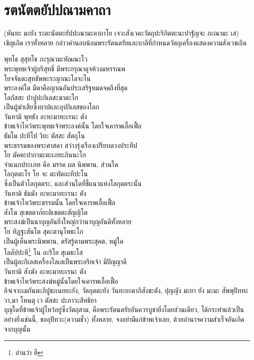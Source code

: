 \documentclass{article}
\begin{document}
\section{รตนัตตยัปปณามคาถา}
\begin{center}
(หันทะ มะยัง ระตะนัตตะยัปปะณามะคาถาโย เจวะสังเวคะวัตถุปะริกิตตะนะปาฐัญจะ ภะณามะ เส)\\เชิญเถิด เราทั้งหลาย กล่าวคำนอบน้อมพระรัตนตรัยและบาลีที่กำหนดวัตถุเครื่องแสดงความสังเวชเถิด
\end{center}
พุทโธ สุสุทโธ กะรุณามะหัณณะโว\\
\indent พระพุทธเจ้าผู้บริสุทธิ์ มีพระกรุณาดุจห้วงมหรรณพ\\
โยจจันตะสุทธัพพะระญาณะโลจะโน\\
\indent พระองค์ใด มีตาคือญาณอันประเสริฐหมดจดถึงที่สุด\\
โลกัสสะ ปาปูปะกิเลสะฆาตะโก\\
\indent เป็นผู้ฆ่าเสียซึ่งบาปและอุปกิเลสของโลก\\
วันทามิ พุทธัง อะหะมาทะเรนะ ตัง\\
\indent ข้าพเจ้าไหว้พระพุทธเจ้าพระองค์นั้น โดยใจเคารพเอื้อเฟื้อ\\
ธัมโม ปะทีโป วิยะ ตัสสะ สัตถุโน\\
\indent พระธรรมของพระศาสดา สว่างรุ่งเรืองเปรียบดวงประทีป\\
โย มัคคะปากามะตะเภทะภินนะโก\\
\indent จำแนกประเภท คือ มรรค ผล นิพพาน, ส่วนใด\\
โลกุตตะโร โย จะ ตะทัตถะทีปะโน\\
\indent ซึ่งเป็นตัวโลกุตตระ, และส่วนใดที่ชี้แนวแห่งโลกุตตระนั้น\\
วันทามิ ธัมมัง อะหะมาทะเรนะ ตัง\\
\indent ข้าพเจ้าไหว้พระธรรมนั้น โดยใจเคารพเอื้อเฟื้อ\\
สังโฆ สุเขตตาภ๎ยะติเขตตะสัญญิโต\\
\indent พระสงฆ์เป็นนาบุญอันยิ่งใหญ่กว่านาบุญอันดีทั้งหลาย\\
โย ทิฏฐะสันโต สุคะตานุโพธะโก\\
\indent เป็นผู้เห็นพระนิพพาน, ตรัสรู้ตามพระสุคต, หมู่ใด\\
โลลัปปะหี\footnote{อ่านว่า ฮี} โน อะริโย สุเมธะโส\\
\indent เป็นผู้ละกิเลสเครื่องโลเลเป็นพระอริยเจ้า มีปัญญาดี\\
วันทามิ สังฆัง อะหะมาทะเรนะ ตัง\\
\indent ข้าพเจ้าไหว้พระสงฆ์หมู่นั้นโดยใจเคารพเอื้อเฟื้อ\\
อิจเจวะเมกันตะภิปูชะเนยยะกัง, วัตถุตตะยัง วันทะยะตาภิสังขะตัง,
ปุญญัง มะยา ยัง มะมะ สัพพุปัททะวา,มา โหนตุ เว ตัสสะ ปะภาวะสิทธิยา\\
\indent บุญใดที่ข้าพเจ้าผู้ไหว้อยู่ซึ่งวัตถุสาม, คือพระรัตนตรัยอันควรบูชายิ่งโดยส่วนเดียว,
ได้กระทำแล้วเป็นอย่างยิ่งเช่นนี้, ขออุปัทวะ(ความชั่ว) ทั้งหลาย,
จงอย่ามีแก่ข้าพเจ้าเลย, ด้วยอำนาจความสำเร็จอันเกิดจากบุญนั้น
\pagebreak
\end{document}
